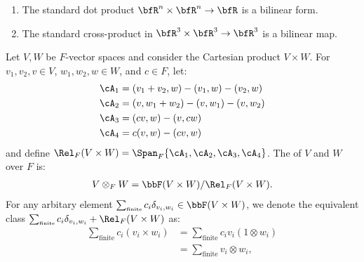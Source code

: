    \begin{example}
        \phantom{a}
        \begin{enumerate}
            \item The standard dot product $\bfR^n \times \bfR^n \rightarrow \bfR$ is a bilinear form.
            \item The standard cross-product in $\bfR^3 \times \bfR^3 \rightarrow \bfR^3$ is a bilinear map.
        \end{enumerate}
    \end{example}

    \begin{definition}
        Let $V,W$ be $F$-vector spaces and consider the Cartesian product $V \times W$. For $v_1,v_2,v \in V$, $w_1,w_2,w \in W$, and $c \in F$, let:
            \begin{equation*}
            \begin{split}
                \cA_1 &= \left(v_1+v_2, w\right)-\left(v_1, w\right)-\left(v_2, w\right) \\
                \cA_2 &= \left(v, w_1+w_2\right)-\left(v, w_1\right)-\left(v, w_2\right) \\
                \cA_3 &= (c v, w)-(v, c w) \\
                \cA_4 &= c(v, w)-(c v, w)
            \end{split}
            \end{equation*}
        and define $\Rel_F(V \times W) = \Span_F\{\cA_1,\cA_2,\cA_3,\cA_4\}$. The  of $V$ and $W$ over $F$ is:
            \begin{equation*}
            \begin{split}
                V \otimes_F W = \bbF(V \times W)/\Rel_F(V \times W).
            \end{split}
            \end{equation*}
        For any arbitary element $\sum_{\text{\tiny finite}}c_i \delta_{v_i,w_i} \in \bbF(V \times W)$, we denote the equivalent class $\sum_{\text{\tiny finite}}c_i \delta_{v_i,w_i} + \Rel_F(V \times W)$ as:
            \begin{equation*}
            \begin{split}
                \sum_{\text{finite}}c_i(v_i \times w_i)
                & = \sum_{\text{finite}}c_i v_i(1 \otimes w_i) \\
                & = \sum_{\text{finite}}v_i \otimes w_i,
            \end{split}
            \end{equation*}

\end{definition}
